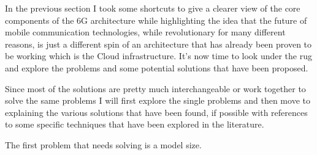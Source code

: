 

In the previous section I took some shortcuts to give a clearer view of the core components of the
6G architecture while highlighting the idea that the future of mobile communication technologies,
while revolutionary for many different reasons, is just a different spin of an architecture that has
already been proven to be working which is the Cloud infrastructure. It's now time to look under the
rug and explore the problems and some potential solutions that have been proposed.

Since most of the solutions are pretty much interchangeable or work together to solve the same
problems I will first explore the single problems and then move to explaining the various solutions
that have been found, if possible with references to some specific techniques that have been
explored in the literature.

The first problem that needs solving is a model size.

